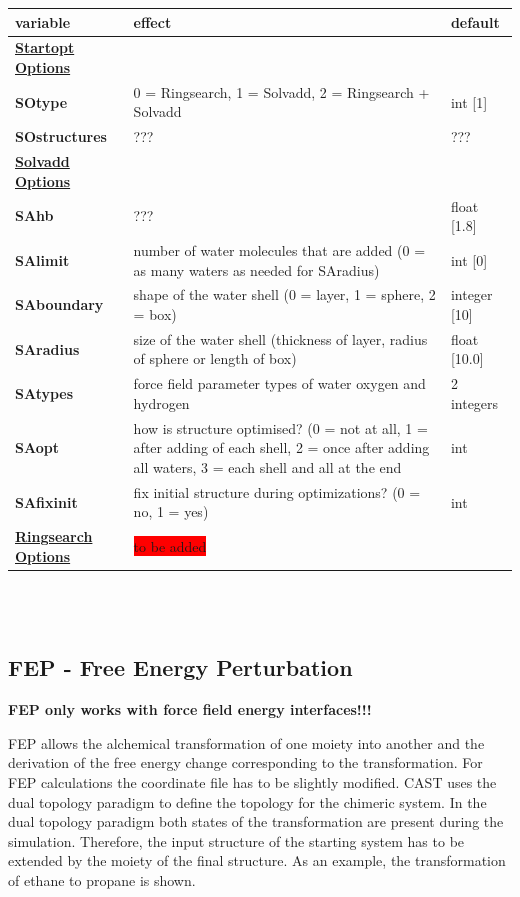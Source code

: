 \documentclass[10pt,a4paper]{article} %
\begin{document}
	\begin{tabularx}{\textwidth}{l|X|X}
		variable & effect & default \\
		\hline
    \textbf{\underline{Startopt Options}} &  &  \\ 
		\textbf{SOtype} & 0 = Ringsearch, 1 = Solvadd, 2 = Ringsearch + Solvadd	& int [1]\\
		\textbf{SOstructures} & ??? & ??? \\
		\hline
		\textbf{\underline{Solvadd Options}} & &  \\
		\textbf{SAhb} & ??? & float [1.8] \\
		\textbf{SAlimit} & number of water molecules that are added (0 = as many waters as needed for SAradius) & int [0] \\
		\textbf{SAboundary} & shape of the water shell (0 = layer, 1 = sphere, 2 = box) & integer [10] \\
		\textbf{SAradius} & size of the water shell (thickness of layer, radius of sphere or length of box) & float [10.0]\\
		\textbf{SAtypes} & force field parameter types of water oxygen and hydrogen & 2 integers \\
		\textbf{SAopt} & how is structure optimised? (0 = not at all, 1 = after adding of each shell, 2 = once after adding all waters, 3 = each shell and all at the end & int \\
		\textbf{SAfixinit} & fix initial structure during optimizations? (0 = no, 1 = yes) & int \\
		\hline
		\textbf{\underline{Ringsearch Options}} & \colorbox{red}{to be added} &  \\ 

		
	\end{tabularx}\\~\\

	\subsection{FEP - Free Energy Perturbation}
	
\textbf{FEP only works with force field energy interfaces!!!}
	
	\acf{FEP} allows the alchemical transformation of one moiety into another and the derivation of the free energy change corresponding to the transformation. For \ac{FEP} calculations the coordinate file has to be slightly modified. \ac{CAST} uses the dual topology paradigm to define the topology for the chimeric system. In the dual topology paradigm both states of the transformation are present during the simulation. Therefore, the input structure of the starting system has to be extended by the moiety of the final structure. As an example, the transformation of ethane to propane is shown. \\
\end{document}
